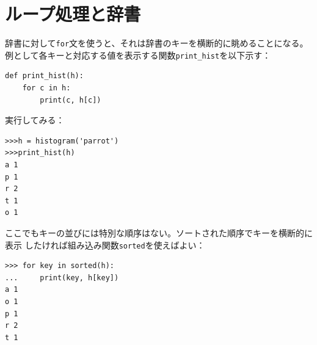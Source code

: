 \documentclass[a4j,12pt,makeidx]{jbook}
\begin{document}
\section{ループ処理と辞書}
辞書に対して{\tt for}文を使うと、それは辞書のキーを横断的に眺めることになる。
例として各キーと対応する値を表示する関数{\tt print\_hist}を以下示す：
\begin{verbatim}
def print_hist(h):
    for c in h:
        print(c, h[c])
\end{verbatim}
実行してみる：
\begin{verbatim}
>>>h = histogram('parrot')
>>>print_hist(h)
a 1
p 1
r 2
t 1
o 1
\end{verbatim}
ここでもキーの並びには特別な順序はない。ソートされた順序でキーを横断的に表示
したければ組み込み関数{\tt sorted}を使えばよい：
\begin{verbatim}
>>> for key in sorted(h):
...     print(key, h[key])
a 1
o 1
p 1
r 2
t 1
\end{verbatim}
%
\end{document}
